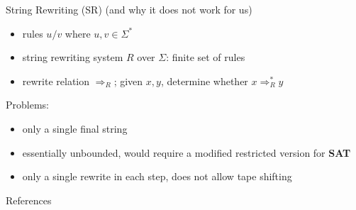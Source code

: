 \documentclass[11pt,usenames,dvipsnames,
hyperref={pdfencoding=auto,psdextra}]{beamer}
\newcommand*{\sat}{\textbf{SAT}}
\begin{document}
\begin{frame}{String Rewriting (SR) (and why it does not work for us)}
  \begin{itemize}
    \item rules $u/v$ where $u, v \in \Sigma^*$
    \item string rewriting system $R$ over $\Sigma$: finite set of rules
    \item rewrite relation $\Rightarrow_R$; given $x, y$, determine whether $x \Rightarrow_R^* y$ 
  \end{itemize}

  Problems: 
  \begin{itemize}
    \item only a single final string 
    \item essentially unbounded, would require a modified restricted version for \sat{}
    \item only a single rewrite in each step, does not allow tape shifting
  \end{itemize}
\end{frame}

\begin{frame}[allowframebreaks]{References}
  \nocite{Sipser:TheoryofComputation}
  \nocite{Bläser:TISkript}
  
  {}
\end{frame}
\end{document}
